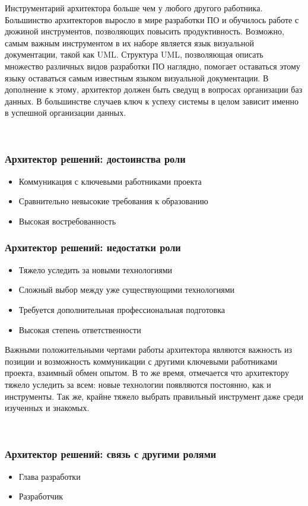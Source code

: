 \documentclass{../industrial-development}
\begin{document}
Инструментарий архитектора больше чем у любого другого работника. Большинство архитекторов выросло в мире разработки ПО и обучилось работе с дюжиной инструментов, позволяющих повысить продуктивность. 
Возможно, самым важным инструментом в их наборе является язык визуальной документации, такой как UML. Структура UML, позволяющая описать множество различных видов разработки ПО наглядно, помогает оставаться этому языку оставаться самым известным языком визуальной документации. 
В дополнение к этому, архитектор должен быть сведущ в вопросах организации баз данных. В большинстве случаев ключ к успеху системы в целом зависит именно в успешной организации данных. 

  ~\cite{Anatomy}

\begin{frame} \frametitle{Архитектор решений: достоинства роли}
  \begin{itemize}
  \item Коммуникация с ключевыми работниками проекта
  \item Сравнительно невысокие требования к образованию 
  \item Высокая востребованность 
  \end{itemize}
\end{frame}

\begin{frame} \frametitle{Архитектор решений: недостатки роли}
  \begin{itemize}
  \item Тяжело уследить за новыми технологиями
  \item Сложный выбор между уже существующими технологиями
  \item Требуется дополнительная профессиональная подготовка
  \item Высокая степень ответственности 
  \end{itemize}
\end{frame}

\lecturenotes

Важными положительными чертами работы архитектора являются важность из позиции и возможность коммуникации с другими ключевыми работниками проекта, взаимный обмен опытом. В то же время, отмечается что архитектору тяжело уследить за всем: новые технологии появляются постоянно, как и инструменты. Так же, крайне тяжело выбрать правильный инструмент даже среди изученных и знакомых. 

  ~\cite{Anatomy}

\begin{frame} \frametitle{Архитектор решений: связь с другими ролями}
  \begin{itemize}
  \item Глава разработки
  \item Разработчик
  \end{itemize}
\end{frame}
\end{document}
